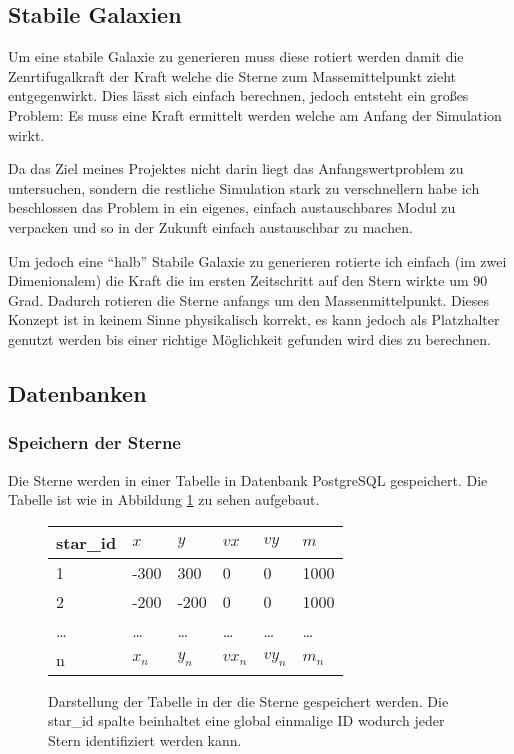 \subsection{Stabile Galaxien}
Um eine stabile Galaxie zu generieren muss diese rotiert werden damit die
Zenrtifugalkraft der Kraft welche die Sterne zum Massemittelpunkt zieht
entgegenwirkt. Dies lässt sich einfach berechnen, jedoch entsteht ein großes
Problem: Es muss eine Kraft ermittelt werden welche am Anfang der Simulation
wirkt.

\par Da das Ziel meines Projektes nicht darin liegt das Anfangswertproblem zu
untersuchen, sondern die restliche Simulation stark zu verschnellern habe ich
beschlossen das Problem in ein eigenes, einfach austauschbares Modul zu
verpacken und so in der Zukunft einfach austauschbar zu machen.

\par Um jedoch eine ``halb'' Stabile Galaxie zu generieren rotierte ich einfach
(im zwei Dimenionalem) die Kraft die im ersten Zeitschritt auf den Stern wirkte
um 90 Grad. Dadurch rotieren die Sterne anfangs um den Massenmittelpunkt.
Dieses Konzept ist in keinem Sinne physikalisch korrekt, es kann jedoch als
Platzhalter genutzt werden bis einer richtige Möglichkeit gefunden wird dies zu
berechnen.

\subsection{Datenbanken}

\subsubsection{Speichern der Sterne}

Die Sterne werden in einer Tabelle in Datenbank \mbox{PostgreSQL} gespeichert.
Die Tabelle ist wie in Abbildung \ref{fig:stars_table} zu sehen aufgebaut.

\begin{figure}[h!]
\centering
\begin{tabular} {l | l | l | l | l | l}
star\_id & \(x\) & \(y\) & \(vx\) & \(vy\) & \(m\) \\ \hline\hline
1        & -300 & 300 & 0  & 0  & 1000 \\ \hline
2        & -200 & -200 & 0  & 0  & 1000 \\ \hline
\dots   & \dots & \dots & \dots & \dots & \dots \\ \hline
n       & \(x_n\) & \(y_n\) & \(vx_n\)& \(vy_n\) & \(m_n\) \\ \hline
\end{tabular}
\caption{Darstellung der Tabelle in der die Sterne gespeichert werden. Die
star\_id spalte beinhaltet eine global einmalige ID wodurch jeder Stern
identifiziert werden kann.}
\label{fig:stars_table}
\end{figure}

